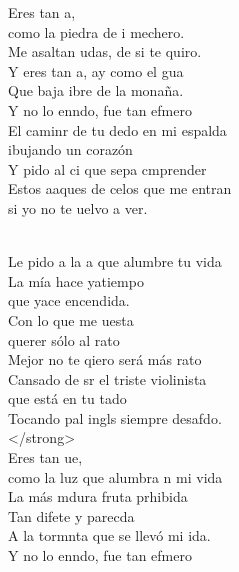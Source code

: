 \begin{cancion}%
	Eres tan a, \\
	como la piedra de i mechero.\\
	Me asaltan udas, de si te quiro.\\
	Y eres tan a, ay como el gua \\
	Que baja ibre de la monaña.\\
\jump
	Y no lo enndo, fue tan efmero \\
	El caminr de tu dedo en mi espalda \\
	ibujando un corazón\\
	Y pido al ci que sepa cmprender\\
	Estos aaques de celos que me entran\\
	si yo no te uelvo a ver.\\\jump\\
	\begin{chorus}%
	Le pido a la a que alumbre tu vida\\
	La mía hace yatiempo \\
que yace encendida.\\
	Con lo que me uesta \\
querer sólo al rato\\
	Mejor no te qiero será más rato\\
	Cansado de sr el triste violinista \\
	que está en tu tado\\
	Tocando pal ingls siempre desafdo. \\
 </strong>\\
	Eres tan ue, \\
	como la luz que alumbra n mi vida\\
	La más mdura fruta prhibida\\
	Tan difete y parecda\\
	A la tormnta que se llevó mi ida.\\
\jump
	Y no lo enndo, fue tan efmero \\

\end{chorus}
\end{cancion}
